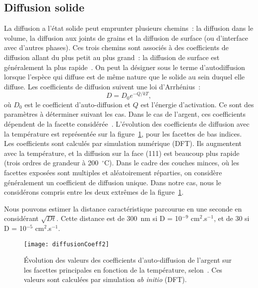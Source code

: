 	\subsection{Diffusion solide}
La diffusion a l'état solide peut emprunter plusieurs chemins~: la diffusion dans le volume, la diffusion aux joints de grains et la diffusion de surface (ou d'interface avec d'autres phases). Ces trois chemins sont associés à des coefficients de diffusion allant du plus petit au plus grand~: la diffusion de surface est généralement la plus rapide~\cite{heitjans2006diffusion}. On peut la désigner sous le terme d'autodiffusion lorsque l'espèce qui diffuse est de même nature que le solide au sein duquel elle diffuse. Les coefficients de diffusion suivent une loi d'Arrhénius~:
\begin{equation}
D = D_0e^{-Q/kT},
\label{eDiffusion}
\end{equation}
où $D_0$ est le coefficient d'auto-diffusion et $Q$ est l'énergie d'activation. Ce sont des paramètres à déterminer suivant les cas. Dans le cas de l'argent, ces coefficients dépendent de la facette considérée~\cite{agrawal2002predicting}. L'évolution des coefficients de diffusion avec la température est représentée sur la figure~\ref{diffusionCoeff}, pour les facettes de bas indices. Les coefficients sont calculés par simulation numérique (DFT). Ils augmentent avec la température, et la diffusion sur la face (111) est beaucoup plus rapide (trois ordres de grandeur à 200~$^\circ$C). Dans le cadre des couches minces, où les facettes exposées sont multiples et aléatoirement réparties, on considère généralement un coefficient de diffusion unique. Dans notre cas, nous le considérons compris entre les deux extrêmes de la figure~\ref{diffusionCoeff}.\par 
Nous pouvons estimer la distance caractéristique parcourue en une seconde en considérant $\sqrt{Dt}$. Cette distance est de 300~nm si D = 10$^{-9}$ cm$^{2}$.s$^{-1}$, et de 30 \micro\meter{} si D = 10$^{-5}$ cm$^{2}$.s$^{-1}$.\par 
\begin{figure}[!htb]
	\centering
	\texttt{[image: diffusionCoeff2]}
	\caption{Évolution des valeurs des coefficients d'auto-diffusion de l'argent sur les facettes
principales en fonction de la température, selon~\cite{agrawal2002predicting}. Ces valeurs sont calculées par simulation \textit{ab initio} (DFT).}
	\label{diffusionCoeff}
\end{figure}



